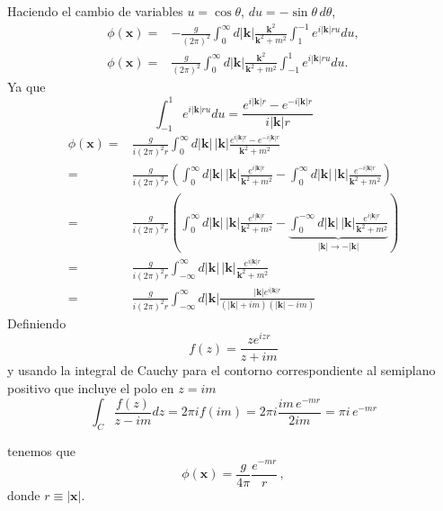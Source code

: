 Haciendo el cambio de variables $u=\cos\theta$, $du=-\sin\theta\,d\theta$,
\begin{align}
  \phi(\mathbf{x})=&-\frac{g}{(2\pi)^2}\int_0^\infty d|\mathbf{k}|
    \frac{\mathbf{k}^2}{\mathbf{k}^2+m^2}\int_{1}^{-1}e^{i|\mathbf{k}|ru}du,\nonumber\\
  \phi(\mathbf{x})=&\frac{g}{(2\pi)^2}\int_0^\infty d|\mathbf{k}|
    \frac{\mathbf{k}^2}{\mathbf{k}^2+m^2}\int_{-1}^1e^{i|\mathbf{k}|ru}du.
\end{align}
Ya que  
\begin{equation*}
  \int_{-1}^1e^{i|\mathbf{k}|ru}du=\frac{e^{i|\mathbf{k}|r}-e^{-i|\mathbf{k}|r}}{i|\mathbf{k}|r}
\end{equation*}
\begin{align}
  \phi(\mathbf{x})=&\frac{g}{i(2\pi)^2r}\int_0^\infty d|\mathbf{k}|\,|\mathbf{k}|
    \frac{e^{i|\mathbf{k}|r}-e^{-i|\mathbf{k}|r}}{\mathbf{k}^2+m^2}\nonumber\\
    =&\frac{g}{i(2\pi)^2r}\left(\int_0^\infty d|\mathbf{k}|\,|\mathbf{k}|
\frac{e^{i|\mathbf{k}|r}}{\mathbf{k}^2+m^2}-\int_0^\infty d|\mathbf{k}|\,|\mathbf{k}|
\frac{e^{-i|\mathbf{k}|r}}{\mathbf{k}^2+m^2}\right)\nonumber\\
=&\frac{g}{i(2\pi)^2r}\left(\int_0^\infty d|\mathbf{k}|\,|\mathbf{k}|
\frac{e^{i|\mathbf{k}|r}}{\mathbf{k}^2+m^2}-\underbrace{\int_0^{-\infty}d|\mathbf{k}|\,|\mathbf{k}|
\frac{e^{i|\mathbf{k}|r}}{\mathbf{k}^2+m^2}}_{|\mathbf{k}|\to-|\mathbf{k}|}\right)\nonumber\\
=&\frac{g}{i(2\pi)^2r}\int_{-\infty}^\infty d|\mathbf{k}|\,|\mathbf{k}|
\frac{e^{i|\mathbf{k}|r}}{\mathbf{k}^2+m^2}\nonumber\\
\label{eq:37}
    =&\frac{g}{i(2\pi)^2r}\int_{-\infty}^\infty d|\mathbf{k}|
    \frac{|\mathbf{k}|e^{i|\mathbf{k}|r}}{(|\mathbf{k}|+im)(|\mathbf{k}|-im)}
\end{align}
Definiendo
\begin{equation*}
  f(z)=\frac{ze^{izr}}{z+im}
\end{equation*}
y usando la integral de Cauchy para el contorno correspondiente al semiplano positivo que incluye el polo en $z=im$
\begin{equation}
  \int_C\frac{f(z)}{z-im}dz=2\pi if(im)=2\pi i\frac{im\,e^{-mr}}{2im}=\pi i\,e^{-mr}
\end{equation}
\begin{frame}
tenemos que
\begin{equation}
 \label{eq:38}
  \phi(\mathbf{x})=\frac{g}{4\pi}\frac{e^{-mr}}{r}\,,
\end{equation}
donde  $r\equiv|\mathbf{x}|$.
\end{frame}

